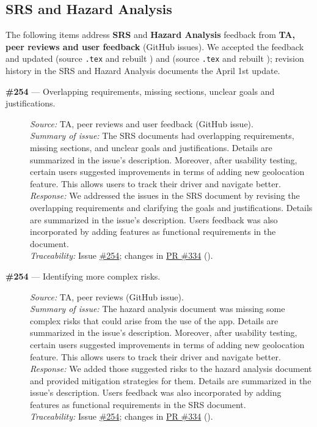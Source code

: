 \documentclass{article}
\begin{document}
\subsection{SRS and Hazard Analysis}
The following items address \textbf{SRS} and \textbf{Hazard Analysis} feedback from \textbf{TA, peer reviews and user feedback} (GitHub issues). We accepted the feedback and updated  (source \texttt{.tex} and rebuilt ) and  (source \texttt{.tex} and rebuilt ); revision history in the SRS and Hazard Analysis documents the April 1st update.
\begin{description}
  \item[\textbf{\#254} --- Overlapping requirements, missing sections, unclear goals and justifications.]
  \textit{Source:} TA, peer reviews and user feedback (GitHub issue). \\
  \textit{Summary of issue:} The SRS documents had overlapping requirements, missing sections, and unclear goals and justifications. Details are summarized in the issue's description.  Moreover, after usability testing, certain users suggested improvements in terms of adding new geolocation feature. This allows users to track their driver and navigate better.\\
  \textit{Response:} We addressed the issues in the SRS document by revising the overlapping requirements and clarifying the goals and justifications. Details are summarized in the issue's description. Users feedback was also incorporated by adding features as functional requirements in the document.\\
  \textit{Traceability:} Issue \href{https://github.com/hitchly/hitchly/issues/254}{\#254}; changes in \href{https://github.com/hitchly/hitchly/pull/334}{PR \#334} ().

  \item[\textbf{\#254} --- Identifying more complex risks.]
\textit{Source:} TA, peer reviews (GitHub issue). \\
\textit{Summary of issue:} The hazard analysis document was missing some complex risks that could arise from the use of the app. Details are summarized in the issue's description. Moreover, after usability testing, certain users suggested improvements in terms of adding new geolocation feature. This allows users to track their driver and navigate better.\\
\textit{Response:} We added those suggested risks to the hazard analysis document and provided mitigation strategies for them. Details are summarized in the issue's description. Users feedback was also incorporated by adding features as functional requirements in the SRS document.\\
\textit{Traceability:} Issue \href{https://github.com/hitchly/hitchly/issues/254}{\#254}; changes in \href{https://github.com/hitchly/hitchly/pull/334}{PR \#334} ().
\end{description}
\end{document}
